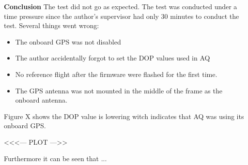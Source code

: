 \textbf{Conclusion}
The test did not go as expected. The test was conducted under a time pressure since the author's supervisor had only 30 minutes to conduct the test.
 Several things went wrong:
\begin{itemize}
	\item The onboard GPS was not disabled
	\item The author accidentally forgot to set the DOP values used in AQ
	\item No reference flight after the firmware were flashed for the first time.
	\item The GPS antenna was not mounted in the middle of the frame as the onboard antenna.
\end{itemize}

Figure X shows the DOP value is lowering witch indicates that AQ was using its onboard GPS.

<<<--- PLOT --->>

Furthermore it can be seen that ...

